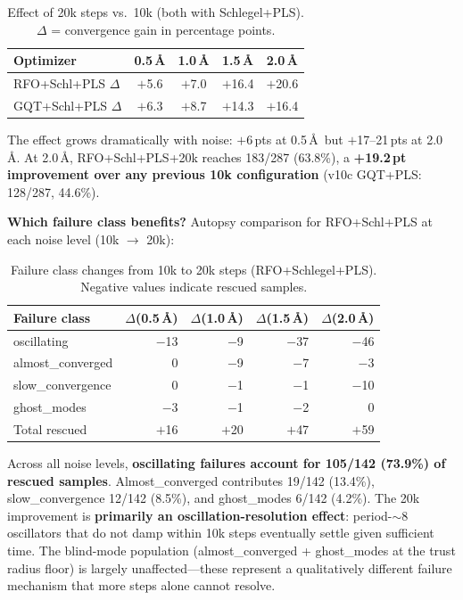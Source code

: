 \documentclass[11pt,a4paper]{article}
\theoremstyle{definition}
\begin{document}
\begin{table}[h]
\centering
\caption{Effect of 20k steps vs.\ 10k (both with Schlegel+PLS).
  $\Delta$ = convergence gain in percentage points.}
\label{tab:20k-effect}
\begin{tabular}{lcccc}
\toprule
Optimizer & 0.5\,\AA & 1.0\,\AA & 1.5\,\AA & 2.0\,\AA \\
\midrule
RFO+Schl+PLS $\Delta$ & $+$5.6 & $+$7.0 & $+$16.4 & $+$20.6 \\
GQT+Schl+PLS $\Delta$ & $+$6.3 & $+$8.7 & $+$14.3 & $+$16.4 \\
\bottomrule
\end{tabular}
\end{table}

The effect grows dramatically with noise: $+$6\,pts at 0.5\,\AA\ but
$+$17--21\,pts at 2.0\,\AA.  At 2.0\,\AA, RFO+Schl+PLS+20k reaches
183/287 (63.8\%), a \textbf{+19.2\,pt improvement over any previous 10k
configuration} (v10c GQT+PLS: 128/287, 44.6\%).

\textbf{Which failure class benefits?}  Autopsy comparison for
RFO+Schl+PLS at each noise level (10k $\to$ 20k):

\begin{table}[h]
\centering
\caption{Failure class changes from 10k to 20k steps (RFO+Schlegel+PLS).
  Negative values indicate rescued samples.}
\label{tab:20k-autopsy}
\begin{tabular}{lrrrr}
\toprule
Failure class & $\Delta$(0.5\,\AA) & $\Delta$(1.0\,\AA) & $\Delta$(1.5\,\AA) & $\Delta$(2.0\,\AA) \\
\midrule
oscillating        & $-$13 & $-$9  & $-$37 & $-$46 \\
almost\_converged   & $\phantom{-}$0 & $-$9  & $-$7  & $-$3  \\
slow\_convergence   & $\phantom{-}$0 & $-$1  & $-$1  & $-$10 \\
ghost\_modes        & $-$3  & $-$1  & $-$2  & $\phantom{-}$0  \\
\midrule
Total rescued       & $+$16 & $+$20 & $+$47 & $+$59  \\
\bottomrule
\end{tabular}
\end{table}

Across all noise levels, \textbf{oscillating failures account for 105/142
(73.9\%) of rescued samples}.  Almost\_converged contributes 19/142 (13.4\%),
slow\_convergence 12/142 (8.5\%), and ghost\_modes 6/142 (4.2\%).
The 20k improvement is \textbf{primarily an oscillation-resolution effect}:
period-$\sim$8 oscillators that do not damp within 10k steps eventually
settle given sufficient time.  The blind-mode population
(almost\_converged + ghost\_modes at the trust radius floor) is largely
unaffected---these represent a qualitatively different failure mechanism
that more steps alone cannot resolve.
\end{document}
